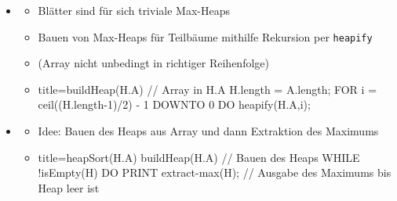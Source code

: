 \documentclass[
    12pt,
    a4paper,
    ngerman,
    color=3b,%
    marginpar=false,
    colorback=false,
    leqno,
]{tudaexercise}
\begin{document}
\begin{itemize}
        \item {}
            \begin{itemize}
                \item Blätter sind für sich triviale Max-Heaps
                \item Bauen von Max-Heaps für Teilbäume mithilfe Rekursion per \texttt{heapify} 
                \item (Array nicht unbedingt in richtiger Reihenfolge)
                \item[]
                    \begin{ccode}[autogobble]{title={buildHeap(H.A) // Array in H.A}}
                    H.length = A.length;
                    FOR i = ceil((H.length-1)/2) - 1 DOWNTO 0 DO
                        heapify(H.A,i);
                    \end{ccode}
            \end{itemize}

        \item {}
            \begin{itemize}
                \item Idee: Bauen des Heaps aus Array und dann Extraktion des Maximums
                \item[]
                    \begin{ccode}[autogobble]{title={heapSort(H.A)}}
                    buildHeap(H.A)                  // Bauen des Heaps
                    WHILE !isEmpty(H) DO
                        PRINT extract-max(H);       // Ausgabe des Maximums bis Heap leer ist
                    \end{ccode}
            \end{itemize}
    \end{itemize}
    \clearpage
\end{document}
